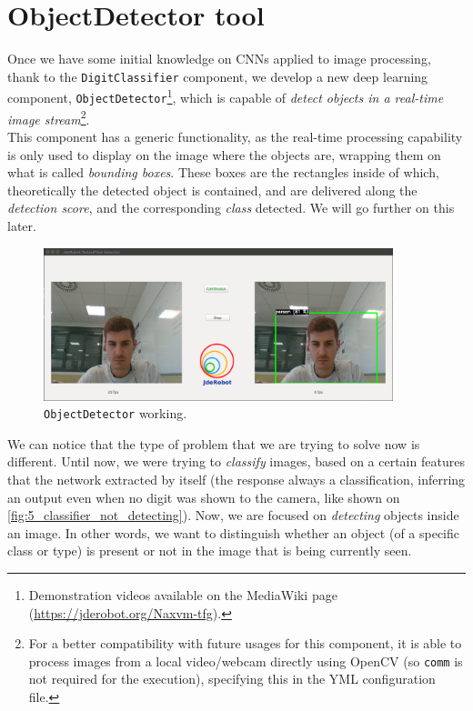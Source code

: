 \chapter{ObjectDetector tool}

	Once we have some initial knowledge on CNNs applied to image processing, thank to the \texttt{DigitClassifier} component, we develop a new deep learning component, \texttt{ObjectDetector}\footnote{Demonstration videos available on the MediaWiki page (\url{https://jderobot.org/Naxvm-tfg}).}, which is capable of \emph{detect objects in a real-time image stream}\footnote{For a better compatibility with future usages for this component, it is able to process images from a local video/webcam directly using OpenCV (so \texttt{comm} is not required for the execution), specifying this in the YML configuration file.}.\\

	This component has a generic functionality, as the real-time processing capability is only used to display on the image where the objects are, wrapping them on what is called \emph{bounding boxes}. These boxes are the rectangles inside of which, theoretically the detected object is contained, and are delivered along the \emph{detection score}, and the corresponding \emph{class} detected. We will go further on this later.\\
	\begin{figure}[h]
		\centering
		\includegraphics[width=4in]{images/objectdetector}
		\caption{\texttt{ObjectDetector} working.}
		\label{fig:5_objectdetector}
	\end{figure}
	
	We can notice that the type of problem that we are trying to solve now is different. Until now, we were trying to \emph{classify} images, based on a certain features that the network extracted by itself (the response always a classification, inferring an output even when no digit was shown to the camera, like shown on \autoref{fig:5_classifier_not_detecting}). Now, we are focused on \emph{detecting} objects inside an image. In other words, we want to distinguish whether an object (of a specific class or type) is present or not in the image that is being currently seen.
	
